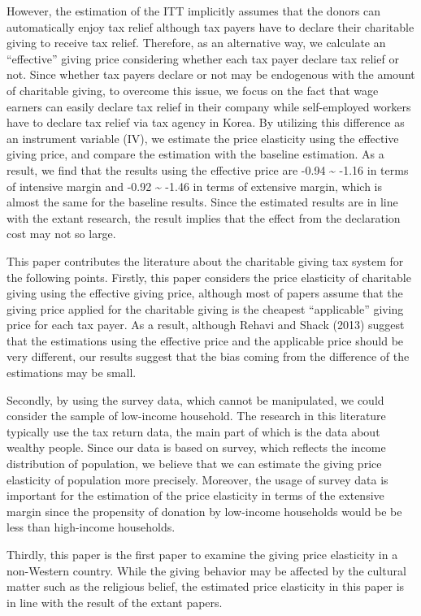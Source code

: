 \documentclass[
  11pt,
  a4paper,
]{article}
\begin{document}
However, the estimation of the ITT implicitly assumes that the donors can automatically enjoy tax relief although tax payers have to declare their charitable giving to receive tax relief. Therefore, as an alternative way, we calculate an ``effective'' giving price considering whether each tax payer declare tax relief or not. Since whether tax payers declare or not may be endogenous with the amount of charitable giving, to overcome this issue, we focus on the fact that wage earners can easily declare tax relief in their company while self-employed workers have to declare tax relief via tax agency in Korea. By utilizing this difference as an instrument variable (IV), we estimate the price elasticity using the effective giving price, and compare the estimation with the baseline estimation. As a result, we find that the results using the effective price are -0.94 \textasciitilde{} -1.16 in terms of intensive margin and -0.92 \textasciitilde{} -1.46 in terms of extensive margin, which is almost the same for the baseline results. Since the estimated results are in line with the extant research, the result implies that the effect from the declaration cost may not so large.

This paper contributes the literature about the charitable giving tax system for the following points. Firstly, this paper considers the price elasticity of charitable giving using the effective giving price, although most of papers assume that the giving price applied for the charitable giving is the cheapest ``applicable'' giving price for each tax payer. As a result, although Rehavi and Shack (2013) suggest that the estimations using the effective price and the applicable price should be very different, our results suggest that the bias coming from the difference of the estimations may be small.

Secondly, by using the survey data, which cannot be manipulated, we could consider the sample of low-income household. The research in this literature typically use the tax return data, the main part of which is the data about wealthy people. Since our data is based on survey, which reflects the income distribution of population, we believe that we can estimate the giving price elasticity of population more precisely. Moreover, the usage of survey data is important for the estimation of the price elasticity in terms of the extensive margin since the propensity of donation by low-income households would be be less than high-income households.

Thirdly, this paper is the first paper to examine the giving price elasticity in a non-Western country. While the giving behavior may be affected by the cultural matter such as the religious belief, the estimated price elasticity in this paper is in line with the result of the extant papers.
\end{document}
